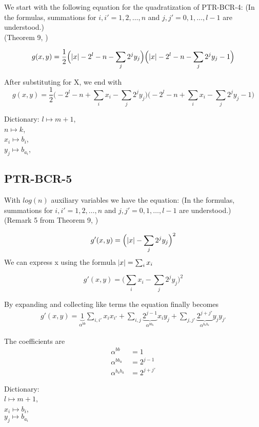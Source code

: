 \documentclass[english,notitlepage,longbibliography,showpacs,preprintnumbers,amsmath,amssymb,aps,prx,nofootinbib,12pt,superscriptaddress]{revtex4-1}
\begin{document}
We start with the following equation for the quadratization of PTR-BCR-4: (In the formulas, summations for $i,i' = 1,2,\dots,n$ and $j,j' = 0,1,\dots,l-1$ are understood.)
\\(Theorem 9, \cite{Boros2018boundsPaper})

\begin{equation}
g(x,y) = \frac{1}{2}\Big(\abs{x} - 2^l - n - \sum_j 2^j y_j\Big)\Big(\abs{x} - 2^l - n - \sum_j 2^j y_j - 1\Big)
\end{equation}

\noindent After substituting for X, we end with
\begin{equation}
g(x,y) = \frac{1}{2}\Big(-2^l - n + \sum_i x_i - \sum_j 2^j y_j\Big)\Big(-2^l - n + \sum_i x_i - \sum_j 2^j y_j - 1\Big)
\end{equation}

\noindent Dictionary:
\noindent $l\mapsto m + 1$,\\
$n\mapsto k$,\\
$x_i\mapsto b_i$,\\
$y_j\mapsto b_{a_i}$,\\



\subsection{PTR-BCR-5} %
With $log(n)$ auxiliary variables we have the equation:
(In the formulas, summations for $i,i' = 1,2,\dots,n$ and $j,j' = 0,1,\dots,l-1$ are understood.)
\\(Remark 5 from Theorem 9, \cite{Boros2018boundsPaper})

\begin{equation}
  g'(x,y) = \Big(\abs{x} - \sum_{j}2^jy_j\Big)^2
\end{equation}
We can express x using the formula $\abs{x} = \sum_i x_i$

\begin{equation}
  g'(x,y) = \Big(\sum_{i}x_i - \sum_{j}2^jy_j\Big)^2
\end{equation}

\noindent By expanding and collecting like terms the equation finally becomes
\begin{equation}
\begin{split}
\left.
g'(x,y)
\right.
= \underbrace{1}_{\alpha^{bb}}\sum_{i,i'}x_i x_{i'}
+ \sum_{i,j}\underbrace{2^{j-1}}_{\alpha^{bb_a}} x_i y_j
+ \sum_{j,j'}\underbrace{2^{j+j'}}_{\alpha^{b_ab_a}}y_j y_{j'}
\end{split}
\end{equation}

\noindent The coefficients are
\begin{subequations}
\begin{align}
\alpha^{bb} &= 1\\
\alpha^{bb_a} &= 2^{j-1}\\
\alpha^{b_ab_a} &= 2^{j+j'}
\end{align}
\end{subequations}

\noindent Dictionary:\\
$l\mapsto m+1$,\\
$x_i\mapsto b_i$,\\
$y_j\mapsto b_{a_i}$\\


\end{document}

